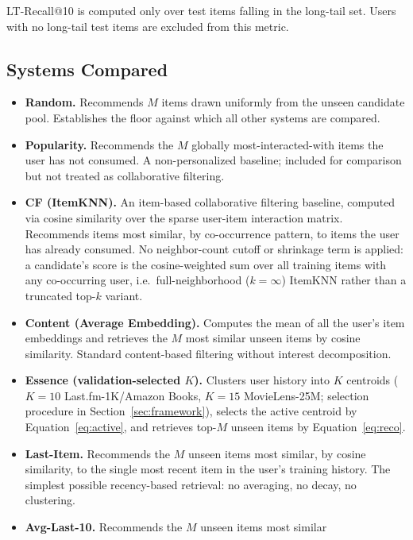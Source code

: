 \documentclass[11pt,a4paper]{article}
\begin{document}
LT-Recall@10 is computed only over test items falling in the long-tail set.
Users with no long-tail test items are excluded from this metric.

\subsection{Systems Compared}
\begin{itemize}[leftmargin=*, itemsep=3pt]
  \item \textbf{Random.} Recommends $M$ items drawn uniformly from the
        unseen candidate pool. Establishes the floor against which all other
        systems are compared.
  \item \textbf{Popularity.} Recommends the $M$ globally most-interacted-with
        items the user has not consumed. A non-personalized baseline;
        included for comparison but not treated as collaborative filtering.
  \item \textbf{CF (ItemKNN).} An item-based collaborative filtering
        baseline, computed via cosine similarity over
        the sparse user-item interaction matrix. Recommends items most
        similar, by co-occurrence pattern, to items the user has already
        consumed. No neighbor-count cutoff or shrinkage term is applied: a
        candidate's score is the cosine-weighted sum over all training items
        with any co-occurring user, i.e.\ full-neighborhood ($k=\infty$)
        ItemKNN rather than a truncated top-$k$ variant.
  \item \textbf{Content (Average Embedding).} Computes the mean of all the
        user's item embeddings and retrieves the $M$ most similar unseen
        items by cosine similarity. Standard content-based filtering without
        interest decomposition.
  \item \textbf{Essence (validation-selected $K$).} Clusters user history into
        $K$ centroids ($K=10$ Last.fm-1K/Amazon Books, $K=15$ MovieLens-25M;
        selection procedure in Section~\ref{sec:framework}), selects the
        active centroid by Equation~\eqref{eq:active}, and retrieves top-$M$
        unseen items by Equation~\eqref{eq:reco}.
  \item \textbf{Last-Item.} Recommends the $M$ unseen items most similar,
        by cosine similarity, to the single most recent item in the user's
        training history. The simplest possible recency-based retrieval:
        no averaging, no decay, no clustering.
  \item \textbf{Avg-Last-10.} Recommends the $M$ unseen items most similar

\end{itemize}
\end{document}
